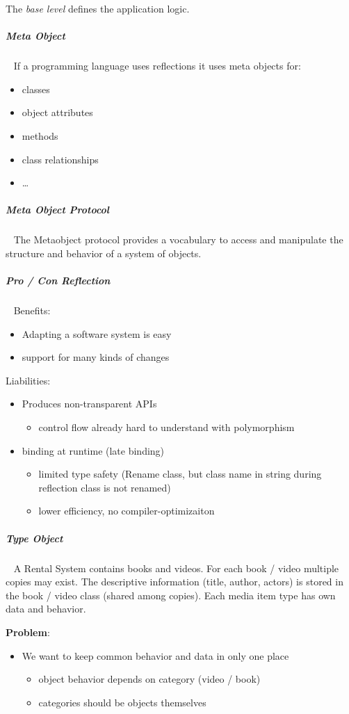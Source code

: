 \documentclass[8pt,twoside,landscape]{extarticle}
\begin{document}
\begin{multicols}{4}
The \emph{base level} defines the application logic.
\subparagraph{Meta Object} \
\label{sec:org12e281f}
If a programming language uses reflections it uses meta objects for:
\begin{itemize}
\item classes
\item object attributes
\item methods
\item class relationships
\item \ldots{}
\end{itemize}
\subparagraph{Meta Object Protocol} \
\label{sec:orgcab1d1b}
The Metaobject protocol provides a vocabulary to access and manipulate the structure and behavior of a system of objects.
\subparagraph{Pro / Con Reflection} \
\label{sec:org6a33388}
Benefits:
\begin{itemize}
\item Adapting a software system is easy
\item support for many kinds of changes
\end{itemize}


Liabilities:
\begin{itemize}
\item Produces non-transparent APIs
\begin{itemize}
\item control flow already hard to understand with polymorphism
\end{itemize}
\item binding at runtime (late binding)
\begin{itemize}
\item limited type safety (Rename class, but class name in string during reflection class is not renamed)
\item lower efficiency, no compiler-optimizaiton
\end{itemize}
\end{itemize}
\subparagraph{Type Object} \
\label{sec:org51b3b6f}
A Rental System contains books and videos.
For each book / video multiple copies may exist.
The descriptive information (title, author, actors) is stored in the book / video class (shared among copies).
Each media item type has own data and behavior.

\textbf{Problem}:
\begin{itemize}
\item We want to keep common behavior and data in only one place
\begin{itemize}
\item object behavior depends on category (video / book)
\item categories should be objects themselves
\end{itemize}
\end{itemize}


\end{multicols}
\end{document}
